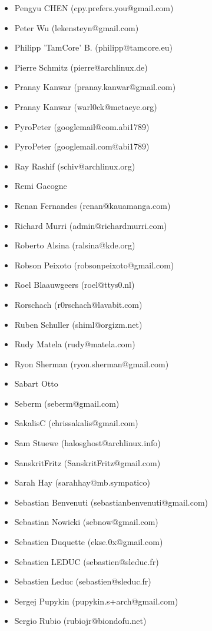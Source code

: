 \begin{latin}
\begin{itemize}
\item  Pengyu CHEN (cpy.prefers.you@gmail.com)
\item  Peter Wu (lekensteyn@gmail.com)
\item  Philipp 'TamCore' B. (philipp@tamcore.eu)
\item  Pierre Schmitz (pierre@archlinux.de)
\item  Pranay Kanwar (pranay.kanwar@gmail.com)
\item  Pranay Kanwar (warl0ck@metaeye.org)
\item  PyroPeter (googlemail@com.abi1789)
\item  PyroPeter (googlemail.com@abi1789)
\item  Ray Rashif (schiv@archlinux.org)
\item  Remi Gacogne
\item  Renan Fernandes (renan@kauamanga.com)
\item  Richard Murri (admin@richardmurri.com)
\item  Roberto Alsina (ralsina@kde.org)
\item  Robson Peixoto (robsonpeixoto@gmail.com)
\item  Roel Blaauwgeers (roel@ttys0.nl)
\item  Rorschach (r0rschach@lavabit.com)
\item  Ruben Schuller (shiml@orgizm.net)
\item  Rudy Matela (rudy@matela.com)
\item  Ryon Sherman (ryon.sherman@gmail.com)
\item  Sabart Otto \item  Seberm (seberm@gmail.com)
\item  SakalisC (chrissakalis@gmail.com)
\item  Sam Stuewe (halosghost@archlinux.info)
\item  SanskritFritz (SanskritFritz@gmail.com)
\item  Sarah Hay (sarahhay@mb.sympatico)
\item  Sebastian Benvenuti (sebastianbenvenuti@gmail.com)
\item  Sebastian Nowicki (sebnow@gmail.com)
\item  Sebastien Duquette (ekse.0x@gmail.com)
\item  Sebastien LEDUC (sebastien@sleduc.fr)
\item  Sebastien Leduc (sebastien@sleduc.fr)
\item  Sergej Pupykin (pupykin.s+arch@gmail.com)
\item  Sergio Rubio (rubiojr@biondofu.net)

\end{itemize}
\end{latin}
